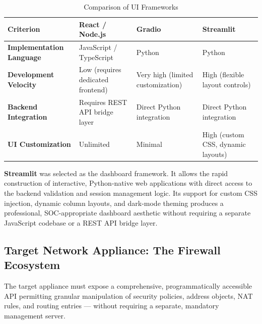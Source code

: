 \begin{table}[htbp]
    \small
    \centering
    \renewcommand{\arraystretch}{1.4}
    \begin{tabular}{|p{3.0cm}|p{3.5cm}|p{3.5cm}|p{3.8cm}|}
        \hline
        \textbf{Criterion} & \textbf{React / Node.js} & \textbf{Gradio} & \textbf{Streamlit} \\
        \hline
        \textbf{Implementation Language} & JavaScript / TypeScript & Python & Python \\
        \hline
        \textbf{Development Velocity} & Low (requires dedicated frontend) & Very high (limited customization) & High (flexible layout controls) \\
        \hline
        \textbf{Backend Integration} & Requires REST API bridge layer & Direct Python integration & Direct Python integration \\
        \hline
        \textbf{UI Customization} & Unlimited & Minimal & High (custom CSS, dynamic layouts) \\
        \hline
    \end{tabular}
    \caption{Comparison of UI Frameworks}
    \label{tab:ui_frameworks}
\end{table}

\textbf{Streamlit} was selected as the dashboard framework. It allows the rapid construction of interactive, Python-native web applications with direct access to the backend validation and session management logic. Its support for custom CSS injection, dynamic column layouts, and dark-mode theming produces a professional, SOC-appropriate dashboard aesthetic without requiring a separate JavaScript codebase or a REST API bridge layer.

\subsection{Target Network Appliance: The Firewall Ecosystem}
The target appliance must expose a comprehensive, programmatically accessible API permitting granular manipulation of security policies, address objects, NAT rules, and routing entries — without requiring a separate, mandatory management server.

